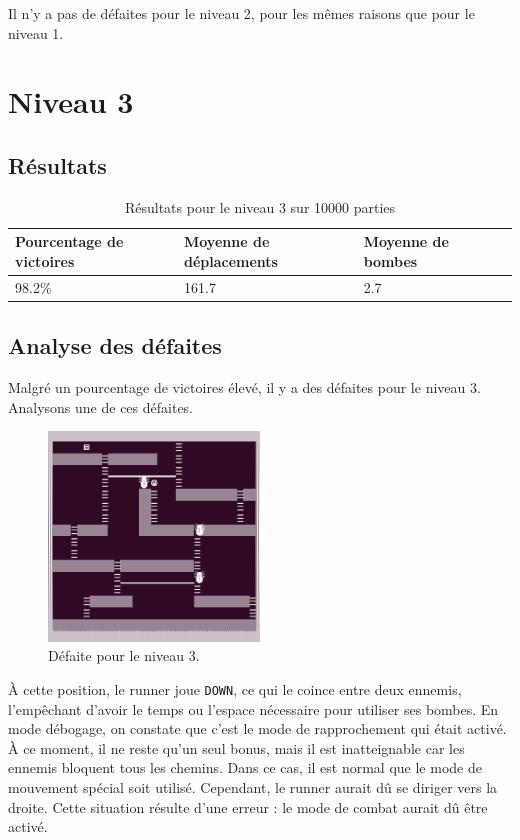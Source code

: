 Il n'y a pas de défaites pour le niveau 2, pour les mêmes raisons que pour le niveau 1.

\newpage

\section{Niveau 3}

\subsection{Résultats}

\begin{table}[!htpb]
    \begin{tabularx}{\textwidth}{lXXX}
        \toprule
        Pourcentage de victoires & Moyenne de déplacements & Moyenne de bombes \\
        \midrule
        98.2\% & 161.7 & 2.7 \\
        \bottomrule
    \end{tabularx}
    \caption{Résultats pour le niveau 3 sur 10000 parties}
    \label{tab:res-niveau-3}
\end{table}

\subsection{Analyse des défaites}

Malgré un pourcentage de victoires élevé, il y a des défaites pour le niveau 3.	Analysons une de ces défaites.

\begin{figure}[!htpb]
    \centering
    \includegraphics[width=0.5\textwidth]{Figures/level3-over.png}
    \caption{Défaite pour le niveau 3.}
    \label{fig:defaite-niveau-3}
\end{figure}

À cette position, le runner joue \texttt{DOWN}, ce qui le coince entre deux ennemis, l'empêchant d'avoir le temps ou l'espace nécessaire pour utiliser ses bombes. En mode débogage, on constate que c'est le mode de rapprochement qui était activé.
\newline
À ce moment, il ne reste qu'un seul bonus, mais il est inatteignable car les ennemis bloquent tous les chemins. Dans ce cas, il est normal que le mode de mouvement spécial soit utilisé. Cependant, le runner aurait dû se diriger vers la droite.
\newline
Cette situation résulte d'une erreur : le mode de combat aurait dû être activé.

